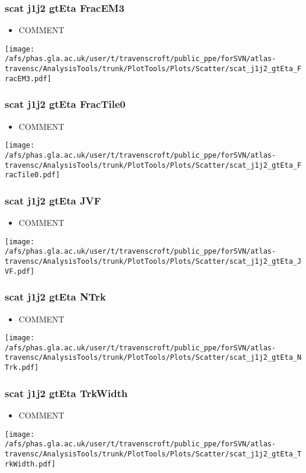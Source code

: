 \documentclass{beamer}
\begin{document}
\begin{frame}
\frametitle{scat j1j2 gtEta FracEM3}
\begin{itemize}
\item COMMENT
\end{itemize}
\begin{center}
\texttt{[image: /afs/phas.gla.ac.uk/user/t/travenscroft/public\_ppe/forSVN/atlas-travensc/AnalysisTools/trunk/PlotTools/Plots/Scatter/scat\_j1j2\_gtEta\_FracEM3.pdf]}
\end{center}
\end{frame}

\begin{frame}
\frametitle{scat j1j2 gtEta FracTile0}
\begin{itemize}
\item COMMENT
\end{itemize}
\begin{center}
\texttt{[image: /afs/phas.gla.ac.uk/user/t/travenscroft/public\_ppe/forSVN/atlas-travensc/AnalysisTools/trunk/PlotTools/Plots/Scatter/scat\_j1j2\_gtEta\_FracTile0.pdf]}
\end{center}
\end{frame}

\begin{frame}
\frametitle{scat j1j2 gtEta JVF}
\begin{itemize}
\item COMMENT
\end{itemize}
\begin{center}
\texttt{[image: /afs/phas.gla.ac.uk/user/t/travenscroft/public\_ppe/forSVN/atlas-travensc/AnalysisTools/trunk/PlotTools/Plots/Scatter/scat\_j1j2\_gtEta\_JVF.pdf]}
\end{center}
\end{frame}

\begin{frame}
\frametitle{scat j1j2 gtEta NTrk}
\begin{itemize}
\item COMMENT
\end{itemize}
\begin{center}
\texttt{[image: /afs/phas.gla.ac.uk/user/t/travenscroft/public\_ppe/forSVN/atlas-travensc/AnalysisTools/trunk/PlotTools/Plots/Scatter/scat\_j1j2\_gtEta\_NTrk.pdf]}
\end{center}
\end{frame}

\begin{frame}
\frametitle{scat j1j2 gtEta TrkWidth}
\begin{itemize}
\item COMMENT
\end{itemize}
\begin{center}
\texttt{[image: /afs/phas.gla.ac.uk/user/t/travenscroft/public\_ppe/forSVN/atlas-travensc/AnalysisTools/trunk/PlotTools/Plots/Scatter/scat\_j1j2\_gtEta\_TrkWidth.pdf]}
\end{center}
\end{frame}
\end{document}
